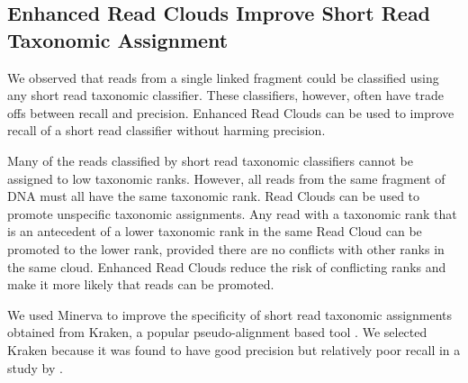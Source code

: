 \subsection*{ Enhanced Read Clouds Improve Short Read Taxonomic Assignment}
\label{sec:kraken}

We observed that reads from a single linked fragment could be classified using any short read taxonomic classifier. These classifiers, however, often have trade offs between recall and precision. Enhanced Read Clouds can be used to improve recall of a short read classifier without harming precision.

Many of the reads classified by short read taxonomic classifiers cannot be assigned to low taxonomic ranks. However, all reads from the same fragment of DNA must all have the same taxonomic rank. Read Clouds can be used to promote unspecific taxonomic assignments.  Any read with a taxonomic rank that is an antecedent of a lower taxonomic rank in the same Read Cloud can be promoted to the lower rank, provided there are no conflicts with other ranks in the same cloud. Enhanced Read Clouds reduce the risk of conflicting ranks and make it more likely that reads can be promoted.

We used Minerva to improve the specificity of short read taxonomic assignments obtained from Kraken, a popular pseudo-alignment based tool \citep{Wood2014}. We selected Kraken because it was found to have good precision but relatively poor recall in a study by \citep{McIntyre2017}. 

